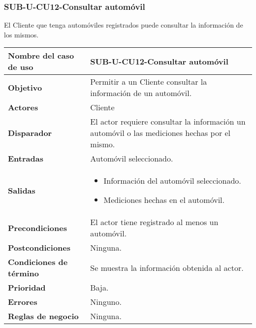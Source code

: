 \subsubsection{SUB-U-CU12-Consultar automóvil}\label{SUB-U-CU12}
El Cliente que tenga automóviles registrados puede consultar la información de los mismos.

\begin{longtable}{|J{5cm}|J{10.3cm}|}
	\hline
	\textbf{Nombre del caso de uso} &
		SUB-U-CU12-Consultar automóvil \\ \hline
	\textbf{Objetivo} &
		Permitir a un Cliente consultar la información de un automóvil. \\ \hline
	\textbf{Actores} &
		Cliente \\ \hline 
	\textbf{Disparador} & 
		El actor requiere consultar la información un automóvil o las mediciones hechas por el mismo. \\ \hline 
	\textbf{Entradas} & Automóvil seleccionado.
		\\ \hline 
	\textbf{Salidas} & 
		\begin{itemize}
			\item Información del automóvil seleccionado.
			\item Mediciones hechas en el automóvil.
		\end{itemize} 
		\\ \hline
	\textbf{Precondiciones} & El actor tiene registrado al menos un automóvil.
		\\ \hline
	\textbf{Postcondiciones} & Ninguna.
		\\ \hline
	\textbf{Condiciones de término} & Se muestra la información obtenida al actor.
		\\ \hline 
	\textbf{Prioridad} & 
		Baja. \\ \hline
	\textbf{Errores} & Ninguno.
		\\ \hline
	\textbf{Reglas de negocio} & Ninguna.
		 \\ \hline
\end{longtable}

